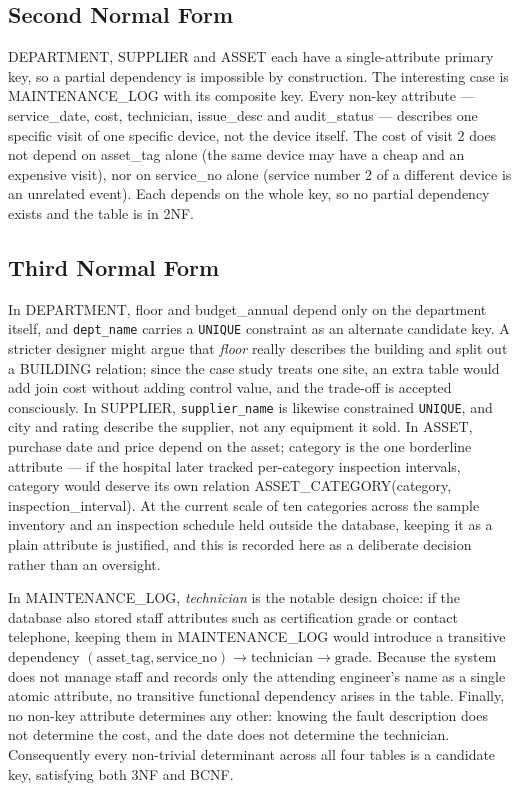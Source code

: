\documentclass[conference]{IEEEtran}
\begin{document}
\subsection{Second Normal Form}
DEPARTMENT, SUPPLIER and ASSET each have a single-attribute primary key, so
a partial dependency is impossible by construction. The interesting case is
MAINTENANCE\_LOG with its composite key. Every non-key attribute ---
service\_date, cost, technician, issue\_desc and audit\_status --- describes
one specific visit of one specific device, not the device itself. The cost
of visit 2 does not depend on asset\_tag alone (the same device may have a
cheap and an expensive visit), nor on service\_no alone (service number 2 of
a different device is an unrelated event). Each depends on the whole key, so
no partial dependency exists and the table is in 2NF.

\subsection{Third Normal Form}
In DEPARTMENT, floor and budget\_annual depend only on the department
itself, and \texttt{dept\_name} carries a \texttt{UNIQUE} constraint as an
alternate candidate key. A stricter designer might argue that \emph{floor}
really describes the building and split out a BUILDING relation; since the
case study treats one site, an extra table would add join cost without adding
control value, and the trade-off is accepted consciously. In SUPPLIER,
\texttt{supplier\_name} is likewise constrained \texttt{UNIQUE}, and city and
rating describe the supplier, not any equipment it sold. In ASSET, purchase
date and price depend on the asset; category is the one borderline attribute
--- if the hospital later tracked per-category inspection intervals,
category would deserve its own relation ASSET\_CATEGORY(category,
inspection\_interval). At the current scale of ten categories across the
sample inventory and an inspection schedule held outside the database,
keeping it as a plain attribute is justified, and this is recorded here as a
deliberate decision rather than an oversight.

In MAINTENANCE\_LOG, \emph{technician} is the notable design choice: if the
database also stored staff attributes such as certification grade or contact
telephone, keeping them in MAINTENANCE\_LOG would introduce a transitive
dependency $(\text{asset\_tag}, \text{service\_no}) \rightarrow
\text{technician} \rightarrow \text{grade}$. Because the system does not
manage staff and records only the attending engineer's name as a single
atomic attribute, no transitive functional dependency arises in the table.
Finally, no non-key attribute determines any other: knowing the fault
description does not determine the cost, and the date does not determine the
technician. Consequently every non-trivial determinant across all four tables
is a candidate key, satisfying both 3NF and BCNF.
\end{document}
